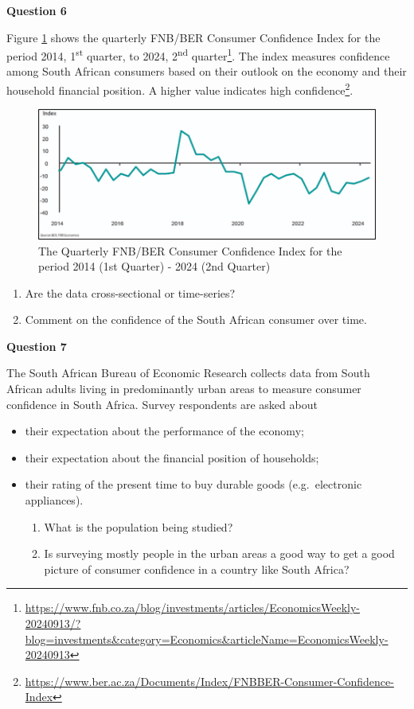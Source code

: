 \documentclass[
]{book}
\begin{document}
\textbf{Question 6}

Figure \ref{fig:figFNB} shows the quarterly FNB/BER Consumer Confidence Index for the period 2014, 1\textsuperscript{st} quarter, to 2024, 2\textsuperscript{nd} quarter\footnote{\url{https://www.fnb.co.za/blog/investments/articles/EconomicsWeekly-20240913/?blog=investments&category=Economics&articleName=EconomicsWeekly-20240913}}. The index measures confidence among South African consumers based on their outlook on the economy and their household financial position. A higher value indicates high confidence\footnote{\url{https://www.ber.ac.za/Documents/Index/FNBBER-Consumer-Confidence-Index}}.

\begin{figure}
\includegraphics[width=0.6\linewidth]{images/clipboard-2186963206} \caption{The Quarterly FNB/BER Consumer Confidence Index for the period 2014 (1st Quarter) - 2024 (2nd Quarter)}\label{fig:figFNB}
\end{figure}

\begin{enumerate}
\def\labelenumi{\alph{enumi}.}
\item
  Are the data cross-sectional or time-series?
\item
  Comment on the confidence of the South African consumer over time.
\end{enumerate}

\textbf{Question 7}

The South African Bureau of Economic Research collects data from South African adults living in predominantly urban areas to measure consumer confidence in South Africa. Survey respondents are asked about

\begin{itemize}
\item
  their expectation about the performance of the economy;
\item
  their expectation about the financial position of households;
\item
  their rating of the present time to buy durable goods (e.g.~electronic appliances).

  \begin{enumerate}
  \def\labelenumi{\alph{enumi}.}
  \item
    What is the population being studied?
  \item
    Is surveying mostly people in the urban areas a good way to get a good picture of consumer confidence in a country like South Africa?
  \end{enumerate}
\end{itemize}
\end{document}
